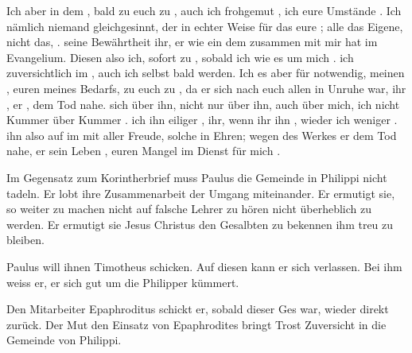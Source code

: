 Ich  aber in dem ,  bald zu euch zu ,  auch ich frohgemut ,  ich eure Umstände .
 Ich  nämlich niemand gleichgesinnt, der in echter Weise für das eure ;  alle  das Eigene, nicht das,   .   seine Bewährtheit  ihr,  er wie ein  dem  zusammen mit mir  hat im Evangelium. Diesen also  ich, sofort zu , sobald ich  wie es um mich .  ich  zuversichtlich im ,  auch ich selbst bald  werden. Ich  es aber für notwendig,  meinen     ,  euren    meines Bedarfs, zu euch zu , da er sich nach euch allen   in Unruhe war,  ihr ,  er , dem Tod nahe.    sich über ihn,  nicht nur über ihn,  auch über mich,  ich nicht Kummer über Kummer .   ich ihn  eiliger ,  ihr, wenn ihr ihn , wieder   ich weniger .  ihn also auf im  mit aller Freude,   solche in Ehren;  wegen des Werkes   er dem Tod nahe,  er sein Leben ,  euren Mangel im Dienst für mich .

 \begin{otsblock}
    \begin{itshape}
        Im Gegensatz zum Korintherbrief muss Paulus die Gemeinde in Philippi nicht tadeln. Er lobt ihre Zusammenarbeit  der Umgang miteinander. Er ermutigt sie, so weiter zu machen  nicht auf falsche Lehrer zu hören  nicht überheblich zu werden. Er ermutigt sie Jesus Christus den Gesalbten zu bekennen  ihm treu zu bleiben.

        Paulus will ihnen Timotheus schicken. Auf diesen kann er sich verlassen. Bei ihm weiss er,  er sich gut um die Philipper kümmert.

        Den Mitarbeiter Epaphroditus schickt er, sobald dieser Ges war, wieder direkt zurück. Der Mut  den Einsatz von Epaphrodites bringt Trost  Zuversicht in die Gemeinde von Philippi.
    \end{itshape}
\end{otsblock}